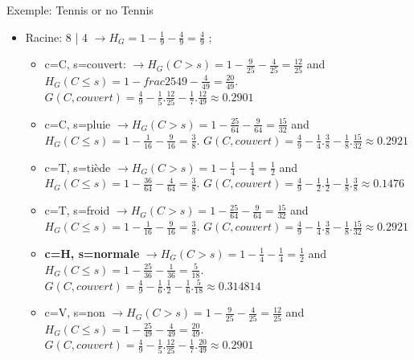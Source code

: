 \documentclass[8pt]{beamer}
\begin{document}
			\begin{frame}{Exemple: Tennis or no Tennis}
				\begin{itemize}
					\item<1-> Racine: 8 | 4 \(\longrightarrow H_G = 1 - \frac{1}{9} - \frac{4}{9} = \frac{4}{9}\) ;
						\begin{itemize}
							\small
							\item c=C, s=couvert: \(\longrightarrow H_G (C > s) = 1 - \frac{9}{25} - \frac{4}{25} = \frac{12}{25}\) and \(H_G (C \leq s) = 1- frac{25}{49} - \frac{4}{49} = \frac{20}{49}\).
								\(G(C, couvert) = \frac{4}{9} - \frac{1}{5} . \frac{12}{25} - \frac{1}{7} . \frac{12}{49} \approx 0.2901\)
							\item c=C, s=pluie \(\longrightarrow H_G (C > s) = 1 - \frac{25}{64} - \frac{9}{64} = \frac{15}{32}\) and \(H_G (C \leq s) = 1- \frac{1}{16} - \frac{9}{16} = \frac{3}{8}\).
								\(G(C, couvert) = \frac{4}{9} - \frac{1}{4} . \frac{3}{8} - \frac{1}{8} . \frac{15}{32} \approx 0.2921\)
							\item c=T, s=tiède \(\longrightarrow H_G (C > s) = 1 - \frac{1}{4} - \frac{1}{4} = \frac{1}{2}\) and \(H_G (C \leq s) = 1- \frac{36}{64} - \frac{4}{64} = \frac{3}{8}\).
								\(G(C, couvert) = \frac{4}{9} - \frac{1}{2} . \frac{1}{2} - \frac{1}{8} . \frac{3}{8} \approx 0.1476\)
							\item c=T, s=froid \(\longrightarrow H_G (C > s) = 1 - \frac{25}{64} - \frac{9}{64} = \frac{15}{32}\) and \(H_G (C \leq s) = 1- \frac{1}{16} - \frac{9}{16} = \frac{3}{8}\).
								\(G(C, couvert) = \frac{4}{9} - \frac{1}{4} . \frac{3}{8} - \frac{1}{8} . \frac{15}{32} \approx 0.2921\)
							\item \textbf{c=H, s=normale} \(\longrightarrow H_G (C > s) = 1 - \frac{1}{4} - \frac{1}{4} = \frac{1}{2}\) and \(H_G (C \leq s) = 1- \frac{25}{36} - \frac{1}{36} = \frac{5}{18}\).
								\(G(C, couvert) = \frac{4}{9} - \frac{1}{6} . \frac{1}{2} - \frac{1}{6} . \frac{5}{18} \approx 0.314814\)
							\item c=V, s=non \(\longrightarrow H_G (C > s) = 1 - \frac{9}{25} - \frac{4}{25} = \frac{12}{25}\) and \(H_G (C \leq s) = 1- \frac{25}{49} - \frac{4}{49} = \frac{20}{49}\).
								\(G(C, couvert) = \frac{4}{9} - \frac{1}{5} . \frac{12}{25} - \frac{1}{7} . \frac{20}{49} \approx 0.2901\)
						\end{itemize}
				\end{itemize}
			\end{frame}
\end{document}
